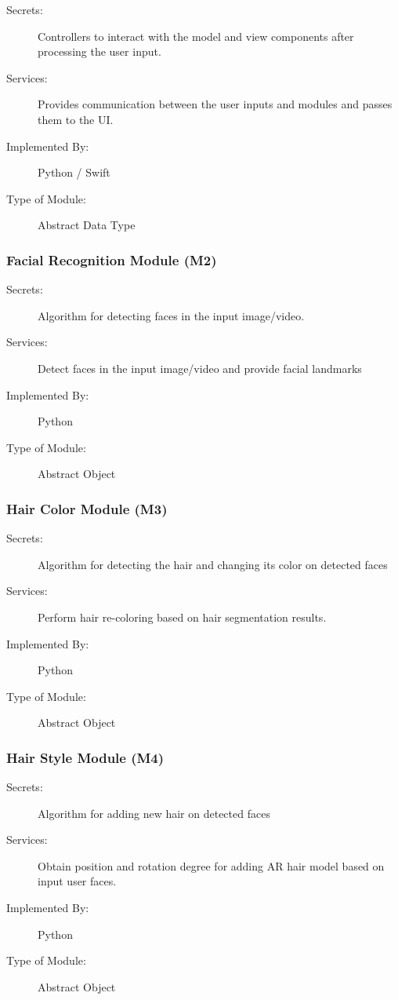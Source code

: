 \documentclass[12pt, titlepage]{article}
\begin{document}
\begin{description}
\item[Secrets:]Controllers to interact with the model and view components after processing the user input.
\item[Services:]Provides communication between the user inputs and modules and passes them to the UI.
\item[Implemented By:] Python / Swift
\item[Type of Module:] Abstract Data Type
\end{description}

\subsubsection{Facial Recognition Module (M2)}

\begin{description}
\item[Secrets:]Algorithm for detecting faces in the input image/video.
\item[Services:]Detect faces in the input image/video and provide facial landmarks
\item[Implemented By:] Python
\item[Type of Module:] Abstract Object
\end{description}

\subsubsection{Hair Color Module (M3)}

\begin{description}
\item[Secrets:]Algorithm for detecting the hair and changing its color on detected faces
\item[Services:] Perform hair re-coloring based on hair segmentation results.
\item[Implemented By:] Python
\item[Type of Module:] Abstract Object
\end{description}

\subsubsection{Hair Style Module (M4)}

\begin{description}
\item[Secrets:]Algorithm for adding new hair on detected faces
\item[Services:]Obtain position and rotation degree for adding AR hair model based on input user faces.
\item[Implemented By:] Python
\item[Type of Module:] Abstract Object
\end{description}
\end{document}
